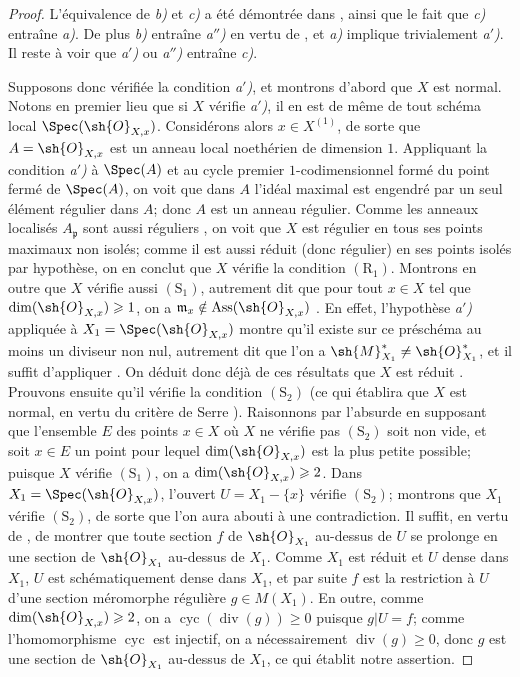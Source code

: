 \begin{proof}
L'équivalence de \emph{b)} et \emph{c)} a été démontrée dans , ainsi que le fait que \emph{c)} entraîne \emph{a)}.
De plus \emph{b)} entraîne \emph{a$''$)} en vertu de , et \emph{a)} implique trivialement \emph{a$'$)}.
Il reste à voir que \emph{a$'$)} ou \emph{a$''$)} entraîne \emph{c)}.

Supposons donc vérifiée la condition \emph{a$'$)}, et montrons d'abord que $X$ est normal.
Notons en premier lieu que si $X$ vérifie \emph{a$'$)}, il en est de même de tout schéma local $\Spec(\sh{O}_{X,x})$.
Considérons alors $x\in X^{(1)}$, de sorte que $A=\sh{O}_{X,x}$ est un anneau local noethérien de dimension $1$.
Appliquant la condition \emph{a$'$)} à $\Spec(A)$ et au cycle premier $1$-codimensionnel formé du point fermé de $\Spec(A)$, on voit que dans $A$ l'idéal maximal est engendré par un seul élément régulier dans $A$;
donc  $A$ est un anneau régulier.
Comme les anneaux localisés $A_{\mathfrak p}$ sont aussi réguliers , on voit que $X$ est régulier en tous ses points maximaux non isolés;
comme il est aussi réduit (donc régulier) en ses points isolés par hypothèse, on en conclut que $X$ vérifie la condition $(\mathrm{R}_1)$.
Montrons en outre que $X$ vérifie aussi $(\mathrm{S}_1)$, autrement dit que pour tout $x\in X$ tel que $\dim(\sh{O}_{X,x})\geq1$, on a $\mathfrak{m}_x\notin\operatorname{Ass}(\sh{O}_{X,x})$ .
En effet, l'hypothèse \emph{a$'$)} appliquée à $X_1=\Spec(\sh{O}_{X,x})$ montre qu'il existe sur ce préschéma au moins un diviseur non nul, autrement dit que l'on a $\sh{M}_{X_1}^*\neq\sh{O}_{X_1}^*$, et il suffit d'appliquer .
On déduit donc déjà de ces résultats que $X$ est réduit .
Prouvons ensuite qu'il vérifie la condition $(\mathrm{S}_2)$ (ce qui établira que $X$ est normal, en vertu du critère de Serre ).
Raisonnons par l'absurde en supposant que l'ensemble $E$ des points $x\in X$ où $X$ ne vérifie pas $(\mathrm{S}_2)$ soit non vide, et soit $x\in E$ un point pour lequel $\dim(\sh{O}_{X,x})$ est la plus petite possible;
puisque $X$ vérifie $(\mathrm{S}_1)$, on a $\dim(\sh{O}_{X,x})\geq2$.
Dans $X_1=\Spec(\sh{O}_{X,x})$, l'ouvert $U=X_1-\{x\}$ vérifie $(\mathrm{S}_2)$;
montrons que $X_1$ vérifie $(\mathrm{S}_2)$, de sorte que l'on aura abouti à une contradiction.
Il suffit, en vertu de , de montrer que toute section $f$ de $\sh{O}_{X_1}$ au-dessus de $U$ se prolonge en une section de $\sh{O}_{X_1}$ au-dessus de $X_1$.
Comme $X_1$ est réduit et $U$ dense dans $X_1$, $U$ est schématiquement dense dans $X_1$, et par suite $f$ est la restriction à $U$ d'une section méromorphe régulière $g\in M(X_1)$.
En outre, comme $\dim(\sh{O}_{X,x})\geq2$, on a $\operatorname{cyc}(\operatorname{div}(g))\geq0$ puisque $g|U=f$;
comme l'homomorphisme $\operatorname{cyc}$ est injectif, on a nécessairement $\operatorname{div}(g)\geq0$, donc  $g$ est une section de $\sh{O}_{X_1}$ au-dessus de $X_1$, ce qui établit notre assertion.


\end{proof}
